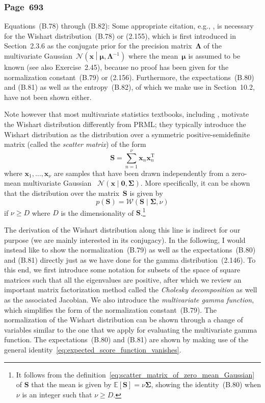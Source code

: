 \documentclass[12pt,a4paper]{article}
\newcommand{\erratum}[1]{%
\subsubsection*{#1}
\addcontentsline{toc}{subsection}{#1}}
\begin{document}
\erratum{Page~693}
Equations~(B.78) through (B.82):
Some appropriate citation, e.g., \citet{Anderson:Multivariate}, is necessary for
the Wishart distribution~(B.78) or (2.155),
which is first introduced in Section~2.3.6 as
the conjugate prior for the precision matrix~$\bm{\Lambda}$ of
the multivariate Gaussian~$\mathcal{N}\left(\mathbf{x}\middle|\bm{\mu}, \bm{\Lambda}^{-1}\right)$
where the mean~$\bm{\mu}$ is assumed to be known (see also Exercise~2.45),
because no proof has been given for the normalization constant~(B.79) or (2.156).
Furthermore, the expectations~(B.80) and (B.81) as well as the entropy~(B.82),
of which we make use in Section~10.2,
have not been shown either.

Note however that most multivariate statistics textbooks, including \citet{Anderson:Multivariate},
motivate the Wishart distribution differently from PRML;
they typically introduce the Wishart distribution
as the distribution over a symmetric positive-semidefinite matrix
(called the \emph{scatter matrix}) of the form
\begin{equation}
\mathbf{S} = \sum_{n=1}^{\nu} \mathbf{x}_n \mathbf{x}_n^{\operatorname{T}}
\label{eq:scatter_matrix_of_zero_mean_Gaussian}
\end{equation}
where $\mathbf{x}_1, \dots, \mathbf{x}_\nu$ are samples that have been drawn
independently from a zero-mean multivariate Gaussian~%
$\mathcal{N}\left(\mathbf{x}\middle|\mathbf{0}, \bm{\Sigma}\right)$.
More specifically, it can be shown that the distribution over the matrix~$\mathbf{S}$ is given by
\begin{equation}
p(\mathbf{S}) = \mathcal{W}\left(\mathbf{S}\middle|\bm{\Sigma}, \nu\right)
\end{equation}
if $\nu \geqslant D$ where $D$ is the dimensionality of $\mathbf{S}$.\footnote{%
It follows from the definition~\eqref{eq:scatter_matrix_of_zero_mean_Gaussian} of
$\mathbf{S}$ that the mean is given by $\mathbb{E}\left[\mathbf{S}\right] = \nu\bm{\Sigma}$,
showing the identity~(B.80) when $\nu$ is an integer such that $\nu \geqslant D$.}

The derivation of the Wishart distribution along this line is indirect for our purpose
(we are mainly interested in its conjugacy).
In the following,
I would instead like to show the normalization~(B.79) as well as the expectations~(B.80) and (B.81)
directly just as we have done for the gamma distribution~(2.146).
To this end, we first introduce some notation for subsets of the space of square matrices
such that all the eigenvalues are positive,
after which we review an important matrix factorization method called
the \emph{Cholesky decomposition} as well as the associated Jacobian.
We also introduce the \emph{multivariate gamma function}, which simplifies
the form of the normalization constant~(B.79).
The normalization of the Wishart distribution can be shown through a change of variables
similar to the one that we apply for evaluating the multivariate gamma function.
The expectations~(B.80) and (B.81) are shown by making use of
the general identity~\eqref{eq:expected_score_function_vanishes}.
\end{document}
